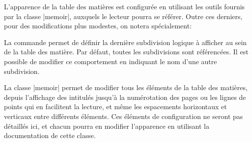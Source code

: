 L'apparence de la table des matières est configurée en utilisant les outils fournis par la classe |memoir|, auxquels le lecteur pourra se référer. Outre ces derniers, pour des modifications plus modestes, on notera spécialement:

\begin{macro}
\end{macro}

La commande  permet de définir la dernière subdivision logique à afficher au sein de la table des matière. Par défaut, toutes les subdivisions sont référencées. Il est possible de modifier ce comportement en indiquant le nom d'une autre subdivision.

\begin{noprint}
\end{noprint}


La classe |memoir| permet de modifier tous les éléments de la table des matières, depuis l'affichage des intitulés jusqu'à la numérotation des pages ou les lignes de points qui en facilitent la lecture, et même les espacements horizontaux et verticaux entre différents éléments. Ces éléments de configuration ne seront pas détaillés ici, et chacun pourra en modifier l'apparence en utilisant la documentation de cette classe.

